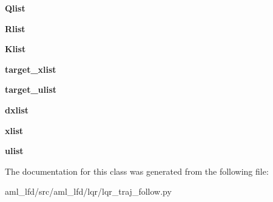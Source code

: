 \begin{DoxyCompactItemize}
{\bfseries Qlist}
\item 
\hypertarget{classaml__lfd_1_1lqr_1_1lqr__traj__follow_1_1_l_q_r_traj_follow_a677cefc87aae3e07521793209eb6a23d}{}\label{classaml__lfd_1_1lqr_1_1lqr__traj__follow_1_1_l_q_r_traj_follow_a677cefc87aae3e07521793209eb6a23d} 
{\bfseries Rlist}
\item 
\hypertarget{classaml__lfd_1_1lqr_1_1lqr__traj__follow_1_1_l_q_r_traj_follow_a5f2bda5589414211230b627c8e3a898c}{}\label{classaml__lfd_1_1lqr_1_1lqr__traj__follow_1_1_l_q_r_traj_follow_a5f2bda5589414211230b627c8e3a898c} 
{\bfseries Klist}
\item 
\hypertarget{classaml__lfd_1_1lqr_1_1lqr__traj__follow_1_1_l_q_r_traj_follow_aab5b823ec9dc177f15a50fc07fdf76bd}{}\label{classaml__lfd_1_1lqr_1_1lqr__traj__follow_1_1_l_q_r_traj_follow_aab5b823ec9dc177f15a50fc07fdf76bd} 
{\bfseries target\+\_\+xlist}
\item 
\hypertarget{classaml__lfd_1_1lqr_1_1lqr__traj__follow_1_1_l_q_r_traj_follow_a6543397245f6804c23f2f3adde765f5f}{}\label{classaml__lfd_1_1lqr_1_1lqr__traj__follow_1_1_l_q_r_traj_follow_a6543397245f6804c23f2f3adde765f5f} 
{\bfseries target\+\_\+ulist}
\item 
\hypertarget{classaml__lfd_1_1lqr_1_1lqr__traj__follow_1_1_l_q_r_traj_follow_a1c7fc079361b526c5af7447d2c744867}{}\label{classaml__lfd_1_1lqr_1_1lqr__traj__follow_1_1_l_q_r_traj_follow_a1c7fc079361b526c5af7447d2c744867} 
{\bfseries dxlist}
\item 
\hypertarget{classaml__lfd_1_1lqr_1_1lqr__traj__follow_1_1_l_q_r_traj_follow_a35e6ec1df9ee8d476105209def393a1b}{}\label{classaml__lfd_1_1lqr_1_1lqr__traj__follow_1_1_l_q_r_traj_follow_a35e6ec1df9ee8d476105209def393a1b} 
{\bfseries xlist}
\item 
\hypertarget{classaml__lfd_1_1lqr_1_1lqr__traj__follow_1_1_l_q_r_traj_follow_a9998974c298bc9a488ce3a01d5269544}{}\label{classaml__lfd_1_1lqr_1_1lqr__traj__follow_1_1_l_q_r_traj_follow_a9998974c298bc9a488ce3a01d5269544} 
{\bfseries ulist}
\end{DoxyCompactItemize}


The documentation for this class was generated from the following file\+:\begin{DoxyCompactItemize}
\item 
aml\+\_\+lfd/src/aml\+\_\+lfd/lqr/lqr\+\_\+traj\+\_\+follow.\+py\end{DoxyCompactItemize}
